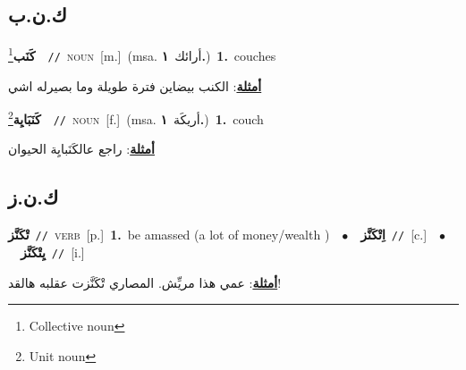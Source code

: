 \documentclass[10pt,a4paper,twoside]{article} %
\begin{document}
\begin{multicols}{2}
\vspace{-3mm}
\subsection*{\color{blue}\foreignlanguage{arabic}{ك.ن.ب}\color{blue}{}} 

{\setlength\topsep{0pt}\textbf{\foreignlanguage{arabic}{كَنَب}}\footnote{Collective noun}\ \ {\color{gray}\texttt{//}\color{black}}\ \textsc{noun}\ [m.]\ \color{gray}(msa. \foreignlanguage{arabic}{أرائك}~\foreignlanguage{arabic}{\textbf{١.}})\color{black}\ \textbf{1.}~couches\  \begin{flushright}\color{gray}\foreignlanguage{arabic}{\textbf{\underline{\foreignlanguage{arabic}{أمثلة}}}: الكنب بيضاين فترة طويلة وما بصيرله اشي}\end{flushright}\color{black}} \vspace{2mm}

{\setlength\topsep{0pt}\textbf{\foreignlanguage{arabic}{كَنَبَايِة}}\footnote{Unit noun}\ \ {\color{gray}\texttt{//}\color{black}}\ \textsc{noun}\ [f.]\ \color{gray}(msa. \foreignlanguage{arabic}{أريكَة}~\foreignlanguage{arabic}{\textbf{١.}})\color{black}\ \textbf{1.}~couch\  \begin{flushright}\color{gray}\foreignlanguage{arabic}{\textbf{\underline{\foreignlanguage{arabic}{أمثلة}}}: راجع عالكَنَبايِة الحيوان}\end{flushright}\color{black}} \vspace{2mm}

\vspace{-3mm}
\subsection*{\color{blue}\foreignlanguage{arabic}{ك.ن.ز}\color{blue}{}} 

{\setlength\topsep{0pt}\textbf{\foreignlanguage{arabic}{تْكَنَّز}}\ {\color{gray}\texttt{//}\color{black}}\ \textsc{verb}\ [p.]\ \textbf{1.}~be amassed (a lot of money/wealth )\ \ $\bullet$\ \ \setlength\topsep{0pt}\textbf{\foreignlanguage{arabic}{اِتْكَنَّز}}\ {\color{gray}\texttt{//}\color{black}}\ [c.]\ \ $\bullet$\ \ \setlength\topsep{0pt}\textbf{\foreignlanguage{arabic}{يِتْكَنَّز}}\ {\color{gray}\texttt{//}\color{black}}\ [i.]\  \begin{flushright}\color{gray}\foreignlanguage{arabic}{\textbf{\underline{\foreignlanguage{arabic}{أمثلة}}}: عمي هذا مريِّش. المصاري تْكَنَّزت عقلبه هالقد!}\end{flushright}\color{black}} \vspace{2mm}


\end{multicols}
\end{document}
